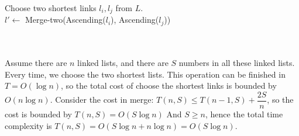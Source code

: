 \documentclass{article}
\begin{document}
\begin{enumerate}
\begin{minipage}[H]{0.8\textwidth}
\begin{algorithm}[H]
{            Choose two shortest links $l_i, l_j$ from $L$.\\
            $l'\leftarrow$ Merge-two(Ascending($l_i$), Ascending($l_j$))\\
            \\
        }
        \BlankLine
        \BlankLine
    \end{algorithm}
\end{minipage}\\
Assume there are $n$ linked lists, and there are $S$ numbers in all these linked lists. Every time, we choose the two shortest lists. This operation can be finished in $T=O(\log n)$, so the total cost of choose the shortest links is bounded by $O(n\log n)$. Consider the cost in merge: $T(n,S)\leq T(n-1,S) + \dfrac{2S}{n}$, so the cost is bounded by $T(n,S)=O(S\log n)$
And $S\geq n$, hence the total time complexity is $T(n,S)=O(S\log n+n\log n)=O(S\log n)$.

~\\


\end{enumerate}
\end{document}
